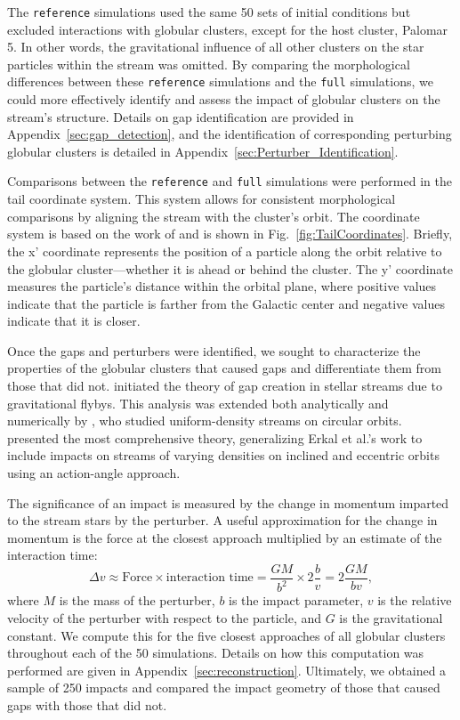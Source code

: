 \documentclass[draft]{aa}
\begin{document}
    The \texttt{reference} simulations used the same 50 sets of initial conditions but excluded interactions with globular clusters, except for the host cluster, Palomar 5. In other words, the gravitational influence of all other clusters on the star particles within the stream was omitted. By comparing the morphological differences between these \texttt{reference} simulations and the \texttt{full} simulations, we could more effectively identify and assess the impact of globular clusters on the stream's structure. Details on gap identification are provided in Appendix~\ref{sec:gap_detection}, and the identification of corresponding perturbing globular clusters is detailed in Appendix~\ref{sec:Perturber_Identification}.


    Comparisons between the \texttt{reference} and \texttt{full} simulations were performed in the tail coordinate system. This system allows for consistent morphological comparisons by aligning the stream with the cluster's orbit. The coordinate system is based on the work of \citet{2004AJ....127.2753D} and is shown in Fig.~\ref{fig:TailCoordinates}. Briefly, the x' coordinate represents the position of a particle along the orbit relative to the globular cluster—whether it is ahead or behind the cluster. The y' coordinate measures the particle's distance within the orbital plane, where positive values indicate that the particle is farther from the Galactic center and negative values indicate that it is closer.

    
    Once the gaps and perturbers were identified, we sought to characterize the properties of the globular clusters that caused gaps and differentiate them from those that did not. \citet{2013ApJ...775...90C} initiated the theory of gap creation in stellar streams due to gravitational flybys. This analysis was extended both analytically and numerically by \citet{2015MNRAS.450.1136E}, who studied uniform-density streams on circular orbits. \citet{2016MNRAS.457.3817S} presented the most comprehensive theory, generalizing Erkal et al.'s work to include impacts on streams of varying densities on inclined and eccentric orbits using an action-angle approach.

    The significance of an impact is measured by the change in momentum imparted to the stream stars by the perturber. A useful approximation for the change in momentum is the force at the closest approach multiplied by an estimate of the interaction time: \begin{equation} \label{eq:change_in_momentum} \Delta v \approx \text{Force} \times \text{interaction time} = \frac{GM}{b^2} \times 2\frac{b}{v} = 2\frac{GM}{bv}, \end{equation} where $M$ is the mass of the perturber, $b$ is the impact parameter, $v$ is the relative velocity of the perturber with respect to the particle, and $G$ is the gravitational constant. We compute this for the five closest approaches of all globular clusters throughout each of the 50 simulations. Details on how this computation was performed are given in Appendix~\ref{sec:reconstruction}. Ultimately, we obtained a sample of 250 impacts and compared the impact geometry of those that caused gaps with those that did not.
    
\end{document}
